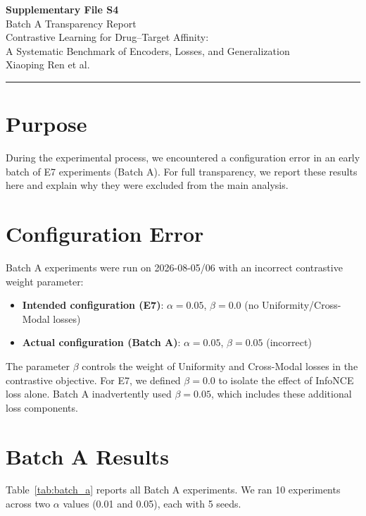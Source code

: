 \documentclass[10pt,a4paper]{article}
\begin{document}
\begin{center}
{\Large\bfseries Supplementary File S4}\\[0.5em]
{\large Batch A Transparency Report}\\[1em]
Contrastive Learning for Drug--Target Affinity:\\A Systematic Benchmark of Encoders, Losses, and Generalization\\[0.5em]
Xiaoping Ren et al.
\end{center}

\noindent\rule{\linewidth}{1pt}
\vspace{1em}

\section{Purpose}

During the experimental process, we encountered a configuration error in an early batch of E7 experiments (Batch A). For full transparency, we report these results here and explain why they were excluded from the main analysis.

\section{Configuration Error}

Batch A experiments were run on 2026-08-05/06 with an incorrect contrastive weight parameter:
\begin{itemize}
\item \textbf{Intended configuration (E7)}: $\alpha=0.05$, $\beta=0.0$ (no Uniformity/Cross-Modal losses)
\item \textbf{Actual configuration (Batch A)}: $\alpha=0.05$, $\beta=0.05$ (incorrect)
\end{itemize}

The parameter $\beta$ controls the weight of Uniformity and Cross-Modal losses in the contrastive objective. For E7, we defined $\beta=0.0$ to isolate the effect of InfoNCE loss alone. Batch A inadvertently used $\beta=0.05$, which includes these additional loss components.

\section{Batch A Results}

Table~\ref{tab:batch_a} reports all Batch A experiments. We ran 10 experiments across two $\alpha$ values (0.01 and 0.05), each with 5 seeds.
\end{document}
